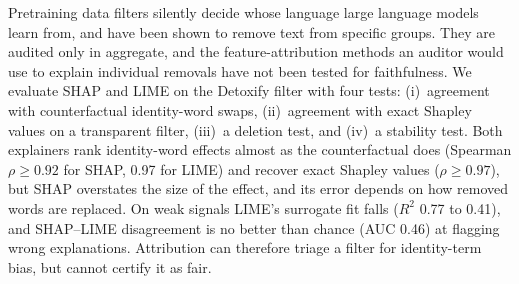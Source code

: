 Pretraining data filters silently decide whose language large language models learn from, and have been shown to remove text from specific groups. They are audited only in aggregate, and the feature-attribution methods an auditor would use to explain individual removals have not been tested for faithfulness. We evaluate SHAP and LIME on the Detoxify filter with four tests: (i)~agreement with counterfactual identity-word swaps, (ii)~agreement with exact Shapley values on a transparent filter, (iii)~a deletion test, and (iv)~a stability test. Both explainers rank identity-word effects almost as the counterfactual does (Spearman $\rho \geq 0.92$ for SHAP, 0.97 for LIME) and recover exact Shapley values ($\rho \geq 0.97$), but SHAP overstates the size of the effect, and its error depends on how removed words are replaced. On weak signals LIME's surrogate fit falls ($R^2$ 0.77 to 0.41), and SHAP--LIME disagreement is no better than chance (AUC 0.46) at flagging wrong explanations. Attribution can therefore triage a filter for identity-term bias, but cannot certify it as fair.
